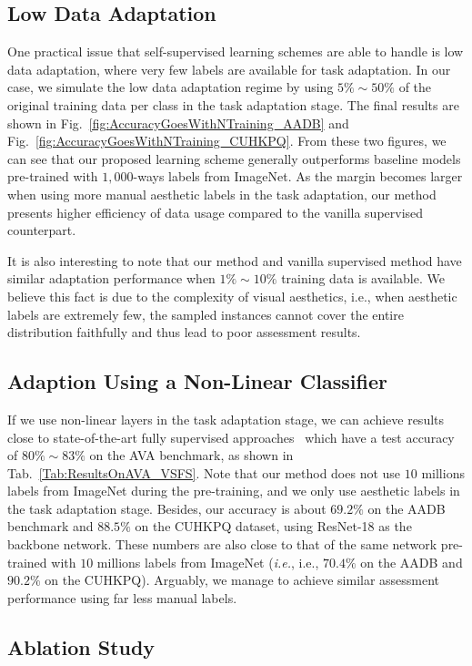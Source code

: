 \documentclass[letterpaper]{article}
\begin{document}
\subsection{Low Data Adaptation}
One practical issue that self-supervised learning schemes are able to handle is low data adaptation, where very few labels are available for task adaptation.
In our case, we simulate the low data adaptation regime by using $5\% \sim 50\%$ of the original training data per class in the task adaptation stage.
The final results are shown in Fig.~\ref{fig:AccuracyGoesWithNTraining_AADB} and Fig.~\ref{fig:AccuracyGoesWithNTraining_CUHKPQ}.
From these two figures, we can see that our proposed learning scheme generally outperforms baseline models pre-trained with $1,000$-ways labels from ImageNet.
As the margin becomes larger when using more manual aesthetic labels in the task adaptation, our method presents higher efficiency of data usage compared to the vanilla supervised counterpart.

It is also interesting to note that our method and vanilla supervised method have similar adaptation performance when $1\% \sim 10 \%$ training data is available.
We believe this fact is due to the complexity of visual aesthetics, i.e., when aesthetic labels are extremely few, the sampled instances cannot cover the entire distribution faithfully and thus lead to poor assessment results.

\subsection{Adaption Using a Non-Linear Classifier}
If we use non-linear layers in the task adaptation stage, we can achieve results close to state-of-the-art fully supervised approaches~\cite{ma2017lamp,sheng2018attention,talebi2018nima,hosu2019effective} which have a test accuracy of $80\%\sim83\%$ on the AVA benchmark, as shown in Tab.~\ref{Tab:ResultsOnAVA_VSFS}.
Note that our method does not use $10$ millions labels from ImageNet during the pre-training, and we only use aesthetic labels in the task adaptation stage.
Besides, our accuracy is about $69.2\%$ on the AADB benchmark and $88.5\%$ on the CUHKPQ dataset, using ResNet-18 as the backbone network.
These numbers are also close to that of the same network pre-trained with $10$ millions labels from ImageNet (\emph{i.e.}, i.e., $70.4\%$ on the AADB and $90.2\%$ on the CUHKPQ).
Arguably, we manage to achieve similar assessment performance using far less manual labels.

\subsection{Ablation Study}
\label{sec:ablation_study}
\end{document}

